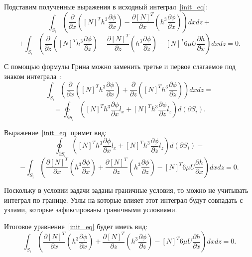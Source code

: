 \documentclass[a4paper,14pt]{extarticle}
\begin{document}
Подставим полученные выражения в исходный интеграл~\eqref{init_eq}:
\begin{equation*}
\int_{S_i} {\left(\frac{\partial}{\partial x} \left( [N]^T h^3 \frac{\partial \phi}{\partial x} \right) - \frac{\partial[N]^T}{\partial x} \left(h^3 \frac{\partial \phi}{\partial x} \right) \right) dxdz} + 
\end{equation*}
\begin{equation*}
 + \int_{S_i} {\left(\frac{\partial}{\partial z} \left( [N]^T h^3 \frac{\partial \phi}{\partial z} \right) - \frac{\partial[N]^T}{\partial z} \left(h^3 \frac{\partial \phi}{\partial z} \right) - [N]^T 6 \mu U \frac{\partial h}{\partial x}\right) dxdz} = 0.
\end{equation*}

С помощью формулы Грина можно заменить третье и первое слагаемое под знаком интеграла~\cite{seligard}:
\begin{equation*}
	\int_{S_i} {\left(\frac{\partial}{\partial x} \left( [N]^T h^3 \frac{\partial \phi}{\partial x} \right) + \frac{\partial}{\partial z} \left( [N]^T h^3 \frac{\partial \phi}{\partial z} \right)  \right)   dxdz} =
\end{equation*}
\begin{equation*}
	= \oint_{\partial S_i} { \left( [N]^T h^3 \frac{\partial \phi}{\partial x} l_x +   [N]^T h^3 \frac{\partial \phi}{\partial z} l_z \right)  d \left( \partial S_i \right)}.
\end{equation*}

Выражение~\eqref{init_eq} примет вид:
\begin{equation*}
	\oint_{\partial S_i} { \left( [N]^T h^3 \frac{\partial \phi}{\partial x} l_x +   [N]^T h^3 \frac{\partial \phi}{\partial z} l_z \right)  d \left( \partial S_i \right)} -
\end{equation*}
\begin{equation*}
	- \int_{S_i} {\left( \frac{\partial[N]^T}{\partial x} \left(h^3 \frac{\partial \phi}{\partial x} \right) +  \frac{\partial[N]^T}{\partial z} \left(h^3 \frac{\partial \phi}{\partial z} \right) - [N]^T 6 \mu U \frac{\partial h}{\partial x}\right) dxdz} = 0.
\end{equation*}

Поскольку в условии задачи заданы граничные условия, то можно не учитывать интеграл по границе. Узлы на которые влияет этот интеграл будут совпадать с узлами, которые зафиксированы граничными условиями.

Итоговое уравнение~\eqref{init_eq} будет иметь вид:
\begin{equation*}
	\int_{S_i} {\left( \frac{\partial[N]^T}{\partial x} \left(h^3 \frac{\partial \phi}{\partial x} \right) +  \frac{\partial[N]^T}{\partial z} \left(h^3 \frac{\partial \phi}{\partial z} \right) - [N]^T 6 \mu U \frac{\partial h}{\partial x}\right) dxdz} = 0.
\end{equation*}
\end{document}
